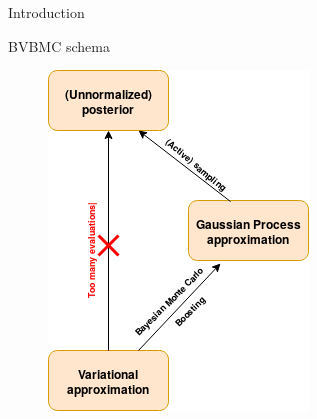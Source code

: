 \documentclass[pdf]{beamer}
\begin{document}
\begin{frame}{Introduction}
\begin{block}{BVBMC schema}
  \begin{figure}[h]
	\centering
	\includegraphics[height=.5\linewidth]{figs/diagram1a.png}
\end{figure}
\end{block}
\end{frame}
\end{document}
